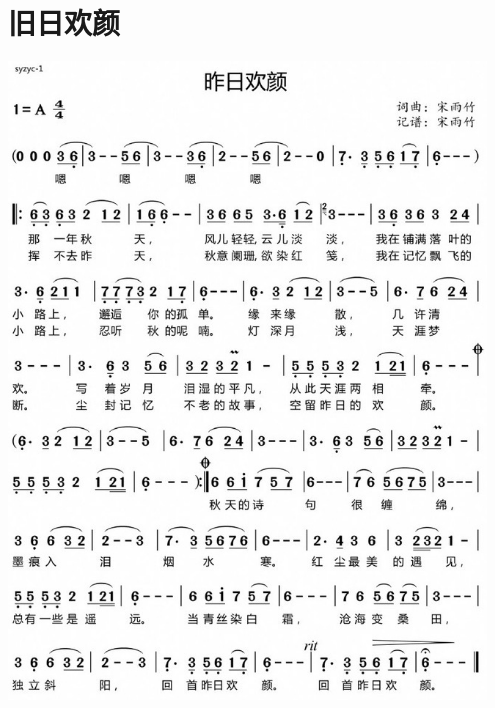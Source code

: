 \documentclass[cn,pad,twocol]{elegantbook}
\begin{document}
\section{旧日欢颜}
    \includegraphics[width=0.95\textwidth]{dongxiao/20200901-旧日欢颜.jpeg} 
\end{document}
